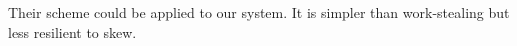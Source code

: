 Their scheme could be applied to our system.
It is simpler than work-stealing but less resilient to skew.








